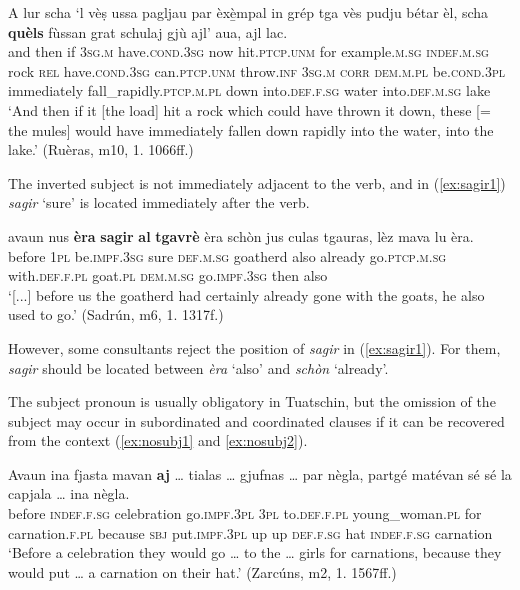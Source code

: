 \ea
\label{ex:subconj4}
\gll   A lur scha `l vèṣ ussa pagljau par èxè̱mpal in grép tga vès pudju bétar èl, scha \textbf{quèls} fùssan grat schulaj gjù ajl’ aua, ajl lac.\\
and then if \textsc{3sg.m} have.\textsc{cond.3sg} now hit.\textsc{ptcp.unm} for example.\textsc{m.sg} \textsc{indef.m.sg} rock \textsc{rel} have.\textsc{cond.3sg} can.\textsc{ptcp.unm} throw.\textsc{inf} \textsc{3sg.m} \textsc{corr} \textsc{dem.m.pl} be.\textsc{cond.3pl} immediately fall\_rapidly.\textsc{ptcp.m.pl} down into.\textsc{def.f.sg} water into.\textsc{def.m.sg} lake\\
\glt `And then if it [the load] hit a rock which could have thrown it down, these [= the mules] would have immediately fallen down rapidly into the water, into the lake.' (Ruèras, m10, 1. 1066ff.)
\z

The inverted subject is not immediately adjacent to the verb, and in (\ref{ex:sagir1}) \textit{sagir} `sure' is located immediately after the verb.

\ea
\label{ex:sagir1}
	\gll [...] avaun nus \textbf{èra} \textbf{sagir} \textbf{al} \textbf{tgavrè} èra schòn jus culas tgauras, lèz mava lu èra.\\
{} before \textsc{1pl} be.\textsc{impf.3sg} sure \textsc{def.m.sg} goatherd also already go.\textsc{ptcp.m.sg} with.\textsc{def.f.pl} goat.\textsc{pl} \textsc{dem.m.sg} go.\textsc{impf.3sg} then also\\
\glt `[...] before us the goatherd had certainly already gone with the goats, he also used to go.' (Sadrún, m6, 1. 1317f.)
\z

However, some consultants reject the position of \textit{sagir} in (\ref{ex:sagir1}). For them, \textit{sagir} should be located between \textit{èra} `also' and \textit{schòn} `already'.

The subject pronoun is usually obligatory in Tuatschin, but the omission of the subject may occur in subordinated and coordinated clauses if it can be recovered from the context (\ref{ex:nosubj1} and \ref{ex:nosubj2}).

\ea
\label{ex:nosubj1}
\gll    Avaun ina fjasta mavan \textbf{aj} … tialas … gjufnas … par nègla, partgé \longrule{} matévan sé sé la capjala … ina nègla.\\
before \textsc{indef.f.sg} celebration go.\textsc{impf.3pl} \textsc{3pl} {} to.\textsc{def.f.pl} {}  young\_woman.\textsc{pl} {} for carnation.\textsc{f.pl} because \textsc{sbj}  put.\textsc{impf.3pl} up up  \textsc{def.f.sg} hat {} \textsc{indef.f.sg} carnation \\
\glt `Before a celebration they would go … to the … girls for carnations, because they would put … a carnation on their hat.' (Zarcúns, m2, 1. 1567ff.)
\z

